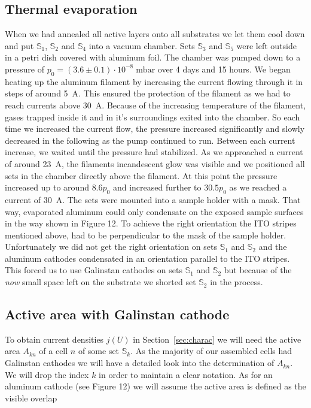 \subsection{Thermal evaporation}
When we had annealed all active layers onto all substrates we let them cool down and put $\mathbb{S}_1$, $\mathbb{S}_2$ and $\mathbb{S}_4$ into a vacuum chamber. Sets $\mathbb{S}_3$ and $\mathbb{S}_5$ were left outside in a petri dish covered with aluminum foil. The chamber was pumped down to a pressure of $p_0 = (3.6\pm 0.1)\cdot 10^{-8}\; \mathrm{mbar}$ over 4 days and 15 hours.\mypar
We began heating up the aluminum filament by increasing the current flowing through it in steps of around 5~A. This ensured the protection of the filament as we had to reach currents above 30~A. Because of the increasing temperature of the filament, gases trapped inside it and in it's surroundings exited into the chamber. So each time we increased the current flow, the pressure increased significantly and slowly decreased in the following as the pump continued to run. Between each current increase, we waited until the pressure had stabilized. As we approached a current of around 23~A, the filaments incandescent glow was visible and we positioned all sets in the chamber directly above the filament. At this point the pressure increased up to around $8.6p_0$ and increased further to $30.5p_0$ as we reached a current of 30~A.\mypar
The sets were mounted into a sample holder with a mask. That way, evaporated aluminum could only condensate on the exposed sample surfaces in the way shown in \cite{labdesc} Figure 12. To achieve the right orientation the ITO stripes mentioned above, had to be perpendicular to the mask of the sample holder. Unfortunately we did not get the right orientation on sets $\mathbb{S}_1$ and $\mathbb{S}_2$ and the aluminum cathodes condensated in an orientation parallel to the ITO stripes. This forced us to use Galinstan cathodes on sets $\mathbb{S}_1$ and $\mathbb{S}_2$ but because of the \emph{now} small space left on the substrate we shorted set $\mathbb{S}_2$ in the process.

\subsection{Active area with Galinstan cathode}

To obtain current densities $j(U)$ in Section~\ref{sec:charac} we will need the active area $A_{kn}$ of a cell $n$ of some set $\mathbb{S}_k$. As the majority of our assembled cells had Galinstan cathodes we will have a detailed look into the determination of $A_{kn}$. We will drop the index $k$ in order to maintain a clear notation.\mypar
As for an aluminum cathode (see \cite{labdesc} Figure 12) we will assume the active area is defined as the visible overlap

